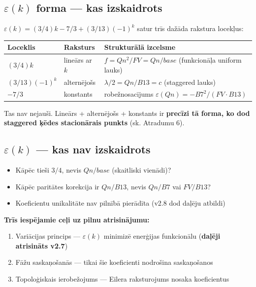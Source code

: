\documentclass[12pt,a4paper]{article}
\begin{document}
\subsection*{$\varepsilon(k)$ forma — kas izskaidrots}

$\varepsilon(k) = (3/4)k - 7/3 + (3/13)(-1)^k$ satur trīs dažāda rakstura locekļus:

\begin{table}[h]
\centering
\begin{tabular}{|l|l|l|}
\hline
\textbf{Loceklis} & \textbf{Raksturs} & \textbf{Strukturālā izcelsme} \\
\hline
$(3/4)k$ & lineārs ar $k$ & $f = Qn^2/FV = Qn/base$ (funkcionāļa uniform lauks) \\
$(3/13)(-1)^k$ & alternējošs & $\lambda/2 = Qn/B13 = c$ (staggered lauks) \\
$-7/3$ & konstants & robežnosacījums $\varepsilon(Qn) = -B7^2/(FV\cdot B13)$ \\
\hline
\end{tabular}
\end{table}

Tas nav nejauši. Lineārs + alternējošs + konstants ir \textbf{precīzi tā forma, ko dod staggered ķēdes stacionārais punkts} (sk. Atradumu 6).

\subsection*{$\varepsilon(k)$ — kas nav izskaidrots}

\begin{itemize}
    \item Kāpēc tieši $3/4$, nevis $Qn/base$ (skaitliski vienādi)?
    \item Kāpēc paritātes korekcija ir $Qn/B13$, nevis $Qn/B7$ vai $FV/B13$?
    \item Koeficientu unikalitāte nav pilnībā pierādīta (v2.8 dod daļēju atbildi)
\end{itemize}

\textbf{Trīs iespējamie ceļi uz pilnu atrisinājumu:}
\begin{enumerate}
    \item Variācijas princips — $\varepsilon(k)$ minimizē enerģijas funkcionālu (\textbf{daļēji atrisināts v2.7})
    \item Fāžu saskaņošanās — tikai šie koeficienti nodrošina saskaņošanos
    \item Topoloģiskais ierobežojums — Eilera raksturojums nosaka koeficientus
\end{enumerate}
\end{document}
